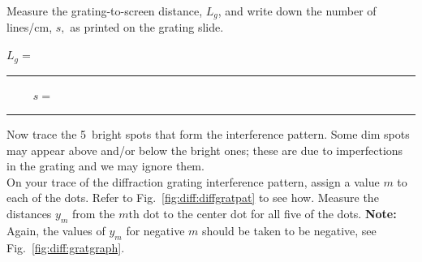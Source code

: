\noindent
Measure the grating-to-screen distance, $L_g$, and write down the number of 
lines/cm, $s,$
as printed on the grating slide. 

\begin{center}
$L_g=$~ \rule{3cm}{.1mm} ~~~~ $s=$~ \rule{3cm}{.1mm}
\end{center}
\vspace*{.5cm}
\noindent  Now trace the 5~bright spots that form the 
interference pattern. Some dim spots may appear above and/or below the bright 
ones; these are due to imperfections in the grating and we may ignore them. \\

\noindent 
On your trace of the diffraction grating interference pattern, assign
a value $m$ to each of the dots. Refer to Fig.~\ref{fig:diff:diffgratpat}
to see how.  Measure the distances $y_m$ from the $m$th dot to the center 
dot for
all five of the dots. {\bf Note:} Again, the values of $y_m$ for
negative $m$ should be taken to be negative, see 
Fig.~\ref{fig:diff:gratgraph}. 


